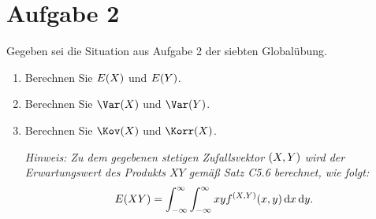 \documentclass{exercise}
\begin{document}
    
    \section*{Aufgabe 2}
    
    \begin{problem}
        Gegeben sei die Situation aus Aufgabe 2 der siebten Globalübung.
        \begin{enumerate}
            \item Berechnen Sie \(E\parentheses*{X}\) und \(E\parentheses*{Y}\).
            \item Berechnen Sie \(\Var\parentheses*{X}\) und \(\Var\parentheses*{Y}\).
            \item Berechnen Sie \(\Kov\parentheses*{X}\) und \(\Korr\parentheses*{X}\).
            
            \emph{Hinweis: Zu dem gegebenen stetigen Zufallsvektor \(\parentheses*{X, Y}\) wird der Erwartungswert des Produkts \(XY\) gemäß Satz C5.6 berechnet, wie folgt:
            \[
                E\parentheses*{XY} = \int_{-\infty}^\infty \int_{-\infty}^\infty xyf^{\parentheses*{X, Y}}\parentheses*{x, y}\d x\d y.
            \]}
        \end{enumerate}
    \end{problem}
    
\end{document}
